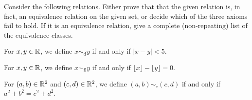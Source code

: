 Consider the following relations.  Either prove that that the given
relation is, in fact, an equivalence relation on the given set, or
decide which of the three axioms fail to hold.  If it is an
equivalence relation, give a complete (non-repeating) list of the
equivalence classes.
\begin{enumerate}
  \Problem 
  For $x,y\in \mathbb{R}$, we define $x\sim_{\text{d}}y$ if and only if $|x-y|
  < 5$.  
  \vfill

  \Problem
  For $x,y\in \mathbb{R}$, we define $x\sim_{\text{fl}}y$ if and only if
  $\lfloor x \rfloor - \lfloor y \rfloor =0$.  
  \vfill

  \Problem 
  For $(a,b)\in \mathbb{R}^2$ and $(c,d)\in \mathbb{R}^2$, we define
  $(a,b)\sim_{\circ}(c,d)$ if and only if $a^2+b^2=c^2+d^2$. 
  \vfill

\end{enumerate}



%

